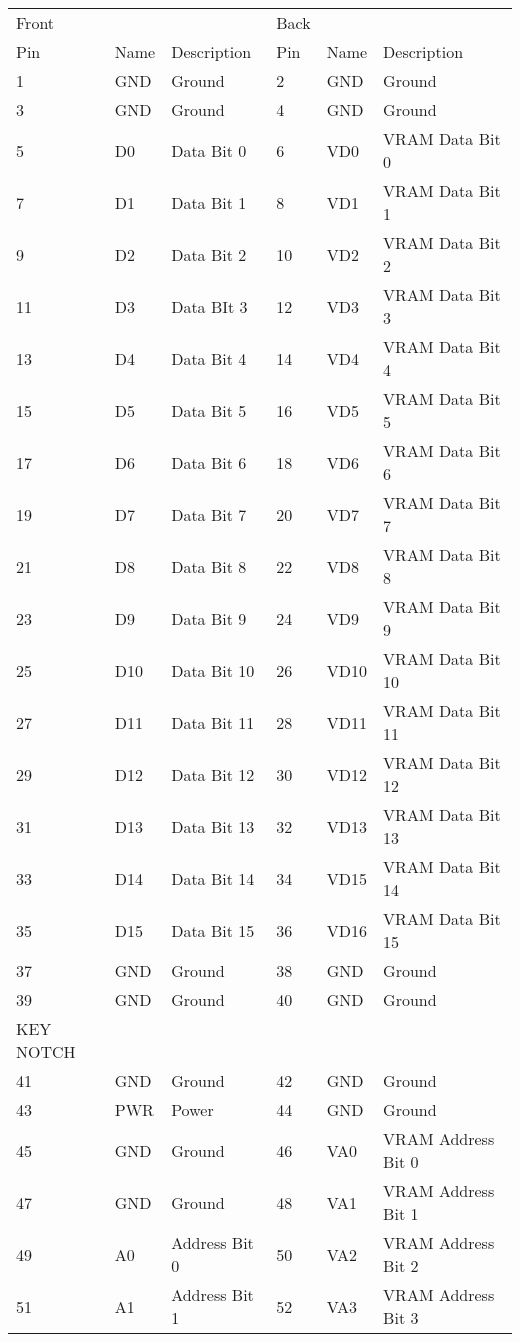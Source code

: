 \documentclass[letterpaper,12pt]{book}
\begin{document}
\begin{tabular}{|l|l|l|l|l|l|}
\hline
	Front & & & Back & & \\
	Pin & Name & Description & Pin & Name & Description\\
\hline
	1 & GND & Ground & 2 & GND & Ground\\
	3 & GND & Ground & 4 & GND & Ground\\
	5 & D0 & Data Bit 0 & 6 & VD0 & VRAM Data Bit 0\\
	7 & D1 & Data Bit 1 & 8 & VD1 & VRAM Data Bit 1\\
	9 & D2 & Data Bit 2 & 10 & VD2 & VRAM Data Bit 2\\
	11 & D3 & Data BIt 3 & 12 & VD3 & VRAM Data Bit 3\\
	13 & D4 & Data Bit 4 & 14 & VD4 & VRAM Data Bit 4\\
	15 & D5 & Data Bit 5 & 16 & VD5 & VRAM Data Bit 5\\
	17 & D6 & Data Bit 6 & 18 & VD6 & VRAM Data Bit 6\\
	19 & D7 & Data Bit 7 & 20 & VD7 & VRAM Data Bit 7\\
	21 & D8 & Data Bit 8 & 22 & VD8 & VRAM Data Bit 8\\
	23 & D9 & Data Bit 9 & 24 & VD9 & VRAM Data Bit 9\\
	25 & D10 & Data Bit 10 & 26 & VD10 & VRAM Data Bit 10\\
	27 & D11 & Data Bit 11 & 28 & VD11 & VRAM Data Bit 11\\
	29 & D12 & Data Bit 12 & 30 & VD12 & VRAM Data Bit 12\\
	31 & D13 & Data Bit 13 & 32 & VD13 & VRAM Data Bit 13\\
	33 & D14 & Data Bit 14 & 34 & VD15 & VRAM Data Bit 14\\
	35 & D15 & Data Bit 15 & 36 & VD16 & VRAM Data Bit 15\\
	37 & GND & Ground & 38 & GND & Ground\\
	39 & GND & Ground & 40 & GND & Ground\\
\hline
	KEY NOTCH\\
\hline
	41 & GND & Ground & 42 & GND & Ground\\
	43 & PWR & Power & 44 & GND & Ground\\
	45 & GND & Ground & 46 & VA0 & VRAM Address Bit 0\\
	47 & GND & Ground & 48 & VA1 & VRAM Address Bit 1\\
	49 & A0 & Address Bit 0 & 50 & VA2 & VRAM Address Bit 2\\
	51 & A1 & Address Bit 1 & 52 & VA3 & VRAM Address Bit 3\\

\end{tabular}
\end{document}
